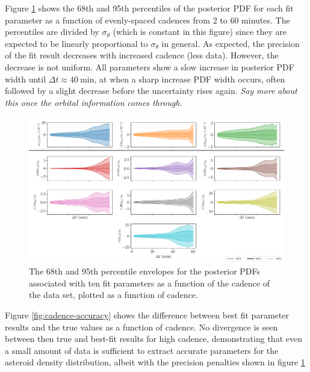 \documentclass{aastex631}
\newcommand{\jtd}[1]{{\color{red}\textit{#1}}}
\newcommand{\siunit}[1]{\ \textrm{#1}}
\begin{document}
Figure \ref{fig:cadence-precision} shows the 68th and 95th percentiles of the posterior PDF for each fit parameter as a function of evenly-spaced cadences from 2 to 60 minutes. The percentiles are divided by $\sigma_\theta$ (which is constant in this figure) since they are expected to be linearly proportional to $\sigma_\theta$ in general. As expected, the precision of the fit result decreases with increased cadence (less data). However, the decrease is not uniform. All parameters show a slow increase in posterior PDF width until $\Delta t \approx 40 \siunit{min}$, at when a sharp increase PDF width occurs, often followed by a slight decrease before the uncertainty rises again. \jtd{Say more about this once the orbital information comes through}.

\begin{figure}
  \centering
  \includegraphics[width=\textwidth]{cadence-precision.pdf}
  \caption{The 68th and 95th percentile envelopes for the posterior PDFs associated with ten fit parameters as a function of the cadence of the data set, plotted as a function of cadence.}
  \label{fig:cadence-precision}
\end{figure}

Figure \ref{fig:cadence-accuracy} shows the difference between best fit parameter results and the true values as a function of cadence. No divergence is seen between then true and best-fit results for high cadence, demonstrating that even a small amount of data is sufficient to extract accurate parameters for the asteroid density distribution, albeit with the precision penalties shown in figure \ref{fig:cadence-precision}
\end{document}
